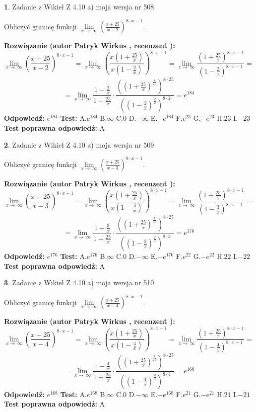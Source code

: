 \documentclass[12pt, a4paper]{article}
\theoremstyle{definition} %
\newtheorem{zad}{}
\newcommand{\zadStart}[1]{\begin{zad}#1\newline}
\newcommand{\zadStop}{\end{zad}}
\newcommand{\rozwStart}[2]{\noindent \textbf{Rozwiązanie (autor #1 , recenzent #2): }\newline}
\newcommand{\rozwStop}{\newline}
\newcommand{\odpStart}{\noindent \textbf{Odpowiedź:}\newline}
\newcommand{\odpStop}{\newline}
\newcommand{\testStart}{\noindent \textbf{Test:}\newline}
\newcommand{\testStop}{\newline}
\newcommand{\kluczStart}{\noindent \textbf{Test poprawna odpowiedź:}\newline}
\newcommand{\kluczStop}{\newline}
\begin{document}
\zadStart{Zadanie z Wikieł Z 4.10 a) moja wersja nr 508}

Obliczyć granicę funkcji  $\lim\limits_{x\to\ \infty}(\frac{x+25}{x-2})^{8\cdot x-1}$.
\zadStop
\rozwStart{Patryk Wirkus}{}
$$\lim\limits_{x\to\ \infty}(\frac{x+25}{x-2})^{8\cdot x-1} = \lim\limits_{x\to\ \infty}(\frac{x(1+\frac{25}{x})}{x(1-\frac{2}{x})})^{8\cdot x-1}=\lim\limits_{x\to\ \infty}\frac{(1+\frac{25}{x})^{8\cdot x-1}}{(1-\frac{2}{x})^{8\cdot x-1}}=$$
$$=\lim\limits_{x\to\ \infty}\frac{1-\frac{2}{x}}{1+\frac{25}{x}}\cdot\frac{((1+\frac{25}{x})^{\frac{x}{25}})^{8\cdot25}}{((1-\frac{2}{x})^{\frac{x}{2}})^{8\cdot2}}=e^{184}$$
\rozwStop
\odpStart
$e^{184}$
\odpStop
\testStart
A.$e^{184}$ B.$\infty$ C.$0$ D.$-\infty$ E.$-e^{184}$
F.$e^{23}$ G.$-e^{23}$
H.$23$
I.$-23$
\testStop
\kluczStart
A
\kluczStop



\zadStart{Zadanie z Wikieł Z 4.10 a) moja wersja nr 509}

Obliczyć granicę funkcji  $\lim\limits_{x\to\ \infty}(\frac{x+25}{x-3})^{8\cdot x-1}$.
\zadStop
\rozwStart{Patryk Wirkus}{}
$$\lim\limits_{x\to\ \infty}(\frac{x+25}{x-3})^{8\cdot x-1} = \lim\limits_{x\to\ \infty}(\frac{x(1+\frac{25}{x})}{x(1-\frac{3}{x})})^{8\cdot x-1}=\lim\limits_{x\to\ \infty}\frac{(1+\frac{25}{x})^{8\cdot x-1}}{(1-\frac{3}{x})^{8\cdot x-1}}=$$
$$=\lim\limits_{x\to\ \infty}\frac{1-\frac{3}{x}}{1+\frac{25}{x}}\cdot\frac{((1+\frac{25}{x})^{\frac{x}{25}})^{8\cdot25}}{((1-\frac{3}{x})^{\frac{x}{3}})^{8\cdot3}}=e^{176}$$
\rozwStop
\odpStart
$e^{176}$
\odpStop
\testStart
A.$e^{176}$ B.$\infty$ C.$0$ D.$-\infty$ E.$-e^{176}$
F.$e^{22}$ G.$-e^{22}$
H.$22$
I.$-22$
\testStop
\kluczStart
A
\kluczStop



\zadStart{Zadanie z Wikieł Z 4.10 a) moja wersja nr 510}

Obliczyć granicę funkcji  $\lim\limits_{x\to\ \infty}(\frac{x+25}{x-4})^{8\cdot x-1}$.
\zadStop
\rozwStart{Patryk Wirkus}{}
$$\lim\limits_{x\to\ \infty}(\frac{x+25}{x-4})^{8\cdot x-1} = \lim\limits_{x\to\ \infty}(\frac{x(1+\frac{25}{x})}{x(1-\frac{4}{x})})^{8\cdot x-1}=\lim\limits_{x\to\ \infty}\frac{(1+\frac{25}{x})^{8\cdot x-1}}{(1-\frac{4}{x})^{8\cdot x-1}}=$$
$$=\lim\limits_{x\to\ \infty}\frac{1-\frac{4}{x}}{1+\frac{25}{x}}\cdot\frac{((1+\frac{25}{x})^{\frac{x}{25}})^{8\cdot25}}{((1-\frac{4}{x})^{\frac{x}{4}})^{8\cdot4}}=e^{168}$$
\rozwStop
\odpStart
$e^{168}$
\odpStop
\testStart
A.$e^{168}$ B.$\infty$ C.$0$ D.$-\infty$ E.$-e^{168}$
F.$e^{21}$ G.$-e^{21}$
H.$21$
I.$-21$
\testStop
\kluczStart
A
\kluczStop
\end{document}
